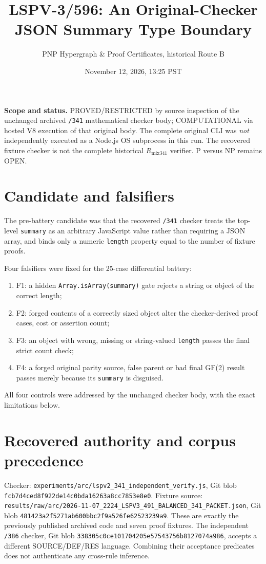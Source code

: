 \documentclass[11pt]{article}
\title{LSPV-3/596: An Original-Checker JSON Summary Type Boundary}
\author{PNP Hypergraph \& Proof Certificates, historical Route B}
\date{November 12, 2026, 13:25 PST}
\begin{document}
\maketitle

\noindent\textbf{Scope and status.} PROVED/RESTRICTED by source inspection of the unchanged archived \texttt{/341} mathematical checker body; COMPUTATIONAL via hosted V8 execution of that original body. The complete original CLI was \emph{not} independently executed as a Node.js OS subprocess in this run. The recovered fixture checker is not the complete historical $R_{\mathrm{mix341}}$ verifier. P versus NP remains OPEN.

\section*{Candidate and falsifiers}
The pre-battery candidate was that the recovered \texttt{/341} checker treats the top-level \texttt{summary} as an arbitrary JavaScript value rather than requiring a JSON array, and binds only a numeric \texttt{length} property equal to the number of fixture proofs.

Four falsifiers were fixed for the 25-case differential battery:
\begin{enumerate}
\item[] F1: a hidden \texttt{Array.isArray(summary)} gate rejects a string or object of the correct length;
\item[] F2: forged contents of a correctly sized object alter the checker-derived proof cases, cost or assertion count;
\item[] F3: an object with wrong, missing or string-valued \texttt{length} passes the final strict count check;
\item[] F4: a forged original parity source, false parent or bad final GF(2) result passes merely because its \texttt{summary} is disguised.
\end{enumerate}
All four controls were addressed by the unchanged checker body, with the exact limitations below.

\section*{Recovered authority and corpus precedence}
Checker: \texttt{experiments/arc/lspv2\_341\_independent\_verify.js},
Git blob \texttt{fcb7d4ced8f922de14c0bda16263a8cc7853e8e0}.
Fixture source: \texttt{results/raw/arc/2026-11-07\_2224\_LSPV3\_491\_BALANCED\_341\_PACKET.json},
Git blob \texttt{481423a2f5271ab600bbc2f9a526fe62523239a9}.
These are exactly the previously published archived code and seven proof fixtures. The independent \texttt{/386} checker, Git blob \texttt{338305c0ce101704205e57543756b8127074a986}, accepts a different SOURCE/DEF/RES language. Combining their acceptance predicates does not authenticate any cross-rule inference.
\end{document}
